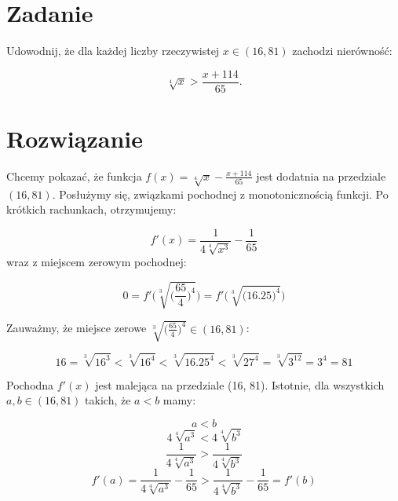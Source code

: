 \documentclass{article}
\begin{document}
\section{Zadanie}

Udowodnij, że dla każdej liczby rzeczywistej \(x \in (16, 81)\) zachodzi nierówność:

\begin{equation*}
    \sqrt[4]{x} > \frac{x + 114}{65}.
\end{equation*}

\section*{Rozwiązanie}

Chcemy pokazać, że funkcja \(f(x) = \sqrt[4]{x} - \frac{x + 114}{65}\) jest dodatnia na przedziale \((16, 81)\).
Posłużymy się, związkami pochodnej z monotonicznością funkcji. Po krótkich rachunkach, otrzymujemy:

\begin{equation*}
    f'(x) = \frac{1}{4 \sqrt[4]{x^{3}}} - \frac{1}{65}
\end{equation*}
wraz z miejscem zerowym pochodnej:

\begin{equation*}
    0 = f'\Bigg(\sqrt[3]{\Big(\frac{65}{4}\Big)^{4}}\Bigg) = f'\Bigg(\sqrt[3]{\Big(16.25\Big)^{4}}\Bigg)
\end{equation*}

Zauważmy, że miejsce zerowe \(\sqrt[3]{\Big(\frac{65}{4}\Big)^{4}} \in (16, 81)\):

\begin{equation*}
    16 = \sqrt[3]{16^{3}} < \sqrt[3]{16^{4}} < \sqrt[3]{16.25^{4}} < \sqrt[3]{27^{4}} = \sqrt[3]{3^{12}} = 3^{4} = 81
\end{equation*}

Pochodna \(f'(x)\) jest malejąca na przedziale (16, 81). Istotnie, dla wszystkich \(a, b \in (16, 81)\) takich, że
\(a < b\) mamy:

\begin{equation*}
    a < b
\end{equation*}
\begin{equation*}
    4 \sqrt[4]{a^{3}} < 4 \sqrt[4]{b^{3}} 
\end{equation*}
\begin{equation*}
    \frac{1}{4 \sqrt[4]{a^{3}}} > \frac{1}{4 \sqrt[4]{b^{3}}}
\end{equation*}
\begin{equation*}
    f'(a) = \frac{1}{4 \sqrt[4]{a^{3}}} - \frac{1}{65}  > \frac{1}{4 \sqrt[4]{b^{3}}} - \frac{1}{65} = f'(b)
\end{equation*}
\end{document}
